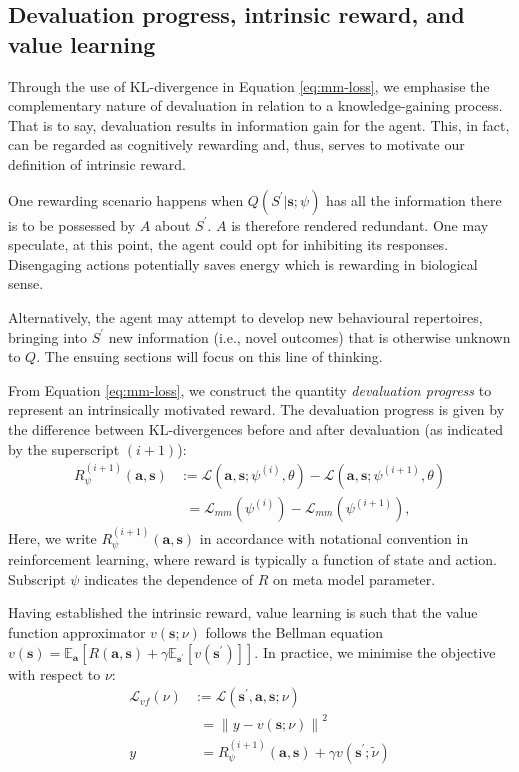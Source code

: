 \documentclass[utf8]{frontiersSCNS}
\newcommand{\norm}[1]{\left\lVert#1\right\rVert}
\newcommand{\bs}{\boldsymbol}
\begin{document}
\subsection{Devaluation progress, intrinsic reward, and value learning}

Through the use of KL-divergence in Equation \ref{eq:mm-loss}, we emphasise the complementary nature of devaluation in relation to a knowledge-gaining process. That is to say, devaluation results in information gain for the agent. This, in fact, can be regarded as cognitively rewarding and, thus, serves to motivate our definition of intrinsic reward. 

One rewarding scenario happens when $Q(S^\prime|\bs{s}; \psi)$ has all the information there is to be possessed by $A$ about $S^\prime$. $A$ is therefore rendered redundant. One may speculate, at this point, the agent could opt for inhibiting its responses. Disengaging actions potentially saves energy which is rewarding in biological sense. 

Alternatively, the agent may attempt to develop new behavioural repertoires, bringing into $S^\prime$ new information (i.e., novel outcomes) that is otherwise unknown to $Q$. The ensuing sections will focus on this line of thinking.

From Equation \ref{eq:mm-loss}, we construct the quantity {\it devaluation progress} to represent an intrinsically motivated reward. The devaluation progress is given by the difference between KL-divergences before and after devaluation (as indicated by the superscript $(i+1)$):
%
	\begin{equation}
	\begin{aligned} \label{eq:deval-prog}
	R_\psi^{(i+1)}(\bs{a}, \bs{s}) 
		&:= 
		\mathcal{L}(\bs{a}, \bs{s}; \psi^{(i)}, \theta) - 
		\mathcal{L}(\bs{a}, \bs{s}; \psi^{(i+1)}, \theta) \\
		&\phantom{:}=	
		\mathcal{L}_{mm}(\psi^{(i)}) - \mathcal{L}_{mm}(\psi^{(i+1)}),
	\end{aligned}
	\end{equation}
%
Here, we write $R_\psi^{(i+1)}(\bs{a}, \bs{s})$ in accordance with notational convention in reinforcement learning, where reward is typically a function of state and action. Subscript $\psi$ indicates the dependence of $R$ on meta model parameter.

Having established the intrinsic reward, value learning is such that the value function approximator $v (\bs{s}; \nu)$ follows the Bellman equation $v(\bs{s}) = \mathbb{E}_{\bs{a}}[R(\bs{a}, \bs{s}) + \gamma \mathbb{E}_{\bs{s}^\prime}[v(\bs{s}^\prime)]]$. In practice, we minimise the objective with respect to $\nu$:
%
	\begin{equation}
	\begin{aligned} \label{eq:vf-loss}
	\mathcal{L}_{vf}(\nu) 
		&:= 
		\mathcal{L}(\bs{s}^\prime, \bs{a}, \bs{s}; \nu) \\ 
		&\phantom{:}= 
		\norm{y - v(\bs{s}; \nu) }^2 \\
		y 
		&\phantom{:}= 
		R_\psi^{(i+1)}(\bs{a}, \bs{s}) + \gamma v(\bs{s}^\prime; \tilde\nu)
	\end{aligned}
	\end{equation}
%
\end{document}
